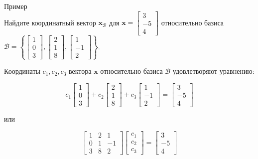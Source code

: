 \documentclass[a4paper,14pt]{extreport} %
\begin{document}
Пример\\ 
Найдите координатный вектор \(\mathbf{x}_{\mathcal{B}}\) для \(\mathbf{x} = \begin{bmatrix} 3 \\ -5 \\ 4 \end{bmatrix}\) относительно базиса \(\mathcal{B} = \left\{ \begin{bmatrix} 1 \\ 0 \\ 3 \end{bmatrix}, \begin{bmatrix} 2 \\ 1 \\ 8 \end{bmatrix}, \begin{bmatrix} 1 \\ -1 \\ 2 \end{bmatrix} \right\}\).

 Координаты \(c_1, c_2, c_3\) вектора \(\mathbf{x}\) относительно базиса \(\mathcal{B}\) удовлетворяют уравнению:

\[ c_1 \begin{bmatrix} 1 \\ 0 \\ 3 \end{bmatrix} + c_2 \begin{bmatrix} 2 \\ 1 \\ 8 \end{bmatrix} + c_3 \begin{bmatrix} 1 \\ -1 \\ 2 \end{bmatrix} = \begin{bmatrix} 3 \\ -5 \\ 4 \end{bmatrix} \]

или

\[ \begin{bmatrix} 1 & 2 & 1 \\ 0 & 1 & -1 \\ 3 & 8 & 2 \end{bmatrix} \begin{bmatrix} c_1 \\ c_2 \\ c_3 \end{bmatrix} = \begin{bmatrix} 3 \\ -5 \\ 4 \end{bmatrix} \tag{3} \]
\end{document}
